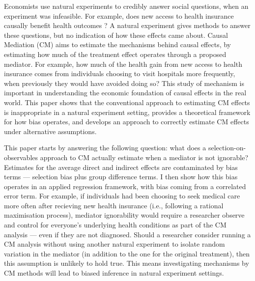 Economists use natural experiments to credibly answer social questions, when an experiment was infeasible.
For example, does new access to health insurance causally benefit health outcomes \citep{finkelstein2008oregon}?
A natural experiment gives methods to answer these questions, but no indication of how these effects came about.
Causal Mediation (CM) aims to estimate the mechanisms behind causal effects, by estimating how much of the treatment effect operates through a proposed mediator.
For example, how much of the health gain from new access to health insurance comes from individuals choosing to visit hospitals more frequently, when previously they would have avoided doing so?
This study of mechanism is important in understanding the economic foundation of causal effects in the real world.
This paper shows that the conventional approach to estimating CM effects is inappropriate in a natural experiment setting, provides a theoretical framework for how bias operates, and develops an approach to correctly estimate CM effects under alternative assumptions.


This paper starts by answering the following question: what does a selection-on-observables approach to CM actually estimate when a mediator is not ignorable?
Estimates for the average direct and indirect effects are contaminated by bias terms --- selection bias plus group difference terms.
I then show how this bias operates in an applied regression framework, with bias coming from a correlated error term.
For example, if individuals had been choosing to seek medical care more often after recieving new health insurance (i.e., following a rational maximisation process),
mediator ignorability would require a researcher observe and control for everyone's underlying health conditions as part of the CM analysis --- even if they are not diagnosed.
Should a researcher consider running a CM analysis without using another natural experiment to isolate random variation in the mediator (in addition to the one for the original treatment), then this assumption is unlikely to hold true.
This means investigating mechanisms by CM methods will lead to biased inference in natural experiment settings.

